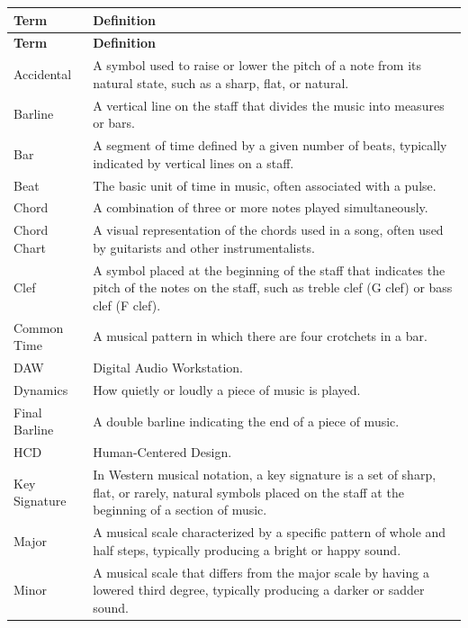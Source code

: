 \documentclass[12pt]{article}
\begin{document}
\begin{longtable}{|l|p{12cm}|}
\hline
\textbf{Term} & \textbf{Definition} \\ 
\hline
\endfirsthead

\hline
\textbf{Term} & \textbf{Definition} \\ 
\hline
\endhead

\hline
\endfoot

\hline
\endlastfoot

Accidental & A symbol used to raise or lower the pitch of a note from its natural state, such as a sharp, flat, or natural. \\ 
\hline
Barline & A vertical line on the staff that divides the music into measures or bars. \\ 
\hline
Bar & A segment of time defined by a given number of beats, typically indicated by vertical lines on a staff. \\ 
\hline
Beat & The basic unit of time in music, often associated with a pulse. \\ 
\hline
Chord & A combination of three or more notes played simultaneously. \\ 
\hline
Chord Chart & A visual representation of the chords used in a song, often used by guitarists and other instrumentalists. \\ 
\hline
Clef & A symbol placed at the beginning of the staff that indicates the pitch of the notes on the staff, such as treble clef (G clef) or bass clef (F clef). \\ 
\hline
Common Time & A musical pattern in which there are four crotchets in a bar. \\ 
\hline
DAW & Digital Audio Workstation. \\ 
\hline
Dynamics & How quietly or loudly a piece of music is played. \\ 
\hline
Final Barline & A double barline indicating the end of a piece of music. \\ 
\hline
HCD & Human-Centered Design. \\ 
\hline
Key Signature & In Western musical notation, a key signature is a set of sharp, flat, or rarely, natural symbols placed on the staff at the beginning of a section of music. \\ 
\hline
Major & A musical scale characterized by a specific pattern of whole and half steps, typically producing a bright or happy sound. \\ 
\hline
Minor & A musical scale that differs from the major scale by having a lowered third degree, typically producing a darker or sadder sound. \\ 

\end{longtable}
\end{document}
